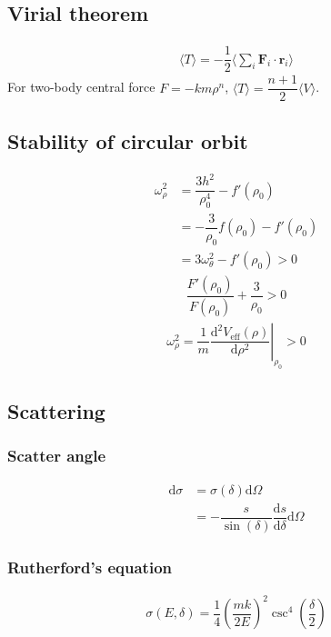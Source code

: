 \documentclass[10pt, a4paper]{article}
\def\d{\mathrm{d}}
\begin{document}
\begin{multicols}{2}
\subsection{Virial theorem}

	\begin{align}
		\langle T \rangle = -\dfrac{1}{2} \langle \sum_i \bm{F}_i \cdot \bm{r}_i \rangle
	\end{align}
	For two-body central force $F = -km\rho^n$, $\langle T \rangle = \dfrac{n + 1}{2} \langle V \rangle$.

\subsection{Stability of circular orbit}

	\begin{align}
		\omega_\rho^2 &= \dfrac{3h^2}{\rho_0^4} - f'(\rho_0)\\
		&= -\dfrac{3}{\rho_0}f(\rho_0) - f'(\rho_0)\\
		&= 3\omega_\theta^2 - f'(\rho_0) > 0
	\end{align}
	\begin{align}
		\dfrac{F'(\rho_0)}{F(\rho_0)} + \dfrac{3}{\rho_0} > 0
	\end{align}
	\begin{align}
		\omega_\rho^2 = \dfrac{1}{m} \left.\dfrac{\d^2 V_{\text{eff}}(\rho)}{\d \rho^2}\right|_{\rho_0} > 0
	\end{align}
	
\subsection{Scattering}

\subsubsection{Scatter angle}

	\begin{align}
		\d \sigma &= \sigma(\delta) \d \Omega \\
		&= - \dfrac{s}{\sin(\delta)}\dfrac{\d s}{\d \delta}\d \Omega
	\end{align}

\subsubsection{Rutherford's equation}
	
	\begin{align}
		\sigma(E, \delta) = \dfrac{1}{4}\left(\dfrac{m k}{2 E}\right)^2 \csc^4\left(\dfrac{\delta}{2}\right)
	\end{align}

\end{multicols}
\end{document}
